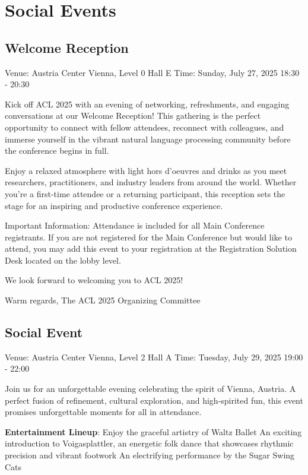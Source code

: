 \chapter{Social Events}

\section{Welcome Reception}
\vspace*{0.2cm}

Venue: Austria Center Vienna, Level 0 Hall E
Time: Sunday, July 27, 2025 18:30 - 20:30

Kick off ACL 2025 with an evening of networking, refreshments, and engaging conversations at our Welcome Reception! This gathering is the perfect opportunity to connect with fellow attendees, reconnect with colleagues, and immerse yourself in the vibrant natural language processing community before the conference begins in full.

Enjoy a relaxed atmosphere with light hors d’oeuvres and drinks as you meet researchers, practitioners, and industry leaders from around the world. Whether you're a first-time attendee or a returning participant, this reception sets the stage for an inspiring and productive conference experience.

Important Information:
Attendance is included for all Main Conference registrants.
If you are not registered for the Main Conference but would like to attend, you may add this event to your registration at the Registration Solution Desk located on the lobby level.

We look forward to welcoming you to ACL 2025!

Warm regards,
The ACL 2025 Organizing Committee

\section{Social Event}
\vspace*{0.2cm}

Venue: Austria Center Vienna, Level 2 Hall A
Time: Tuesday, July 29, 2025 19:00 - 22:00

Join us for an unforgettable evening celebrating the spirit of Vienna, Austria. A perfect fusion of refinement, cultural exploration, and high-spirited fun, this event promises unforgettable moments for all in attendance.

\textbf{Entertainment Lineup}:
Enjoy the graceful artistry of Waltz Ballet
An exciting introduction to Voigasplattler, an energetic folk dance that showcases rhythmic precision and vibrant footwork
An electrifying performance by the Sugar Swing Cats

